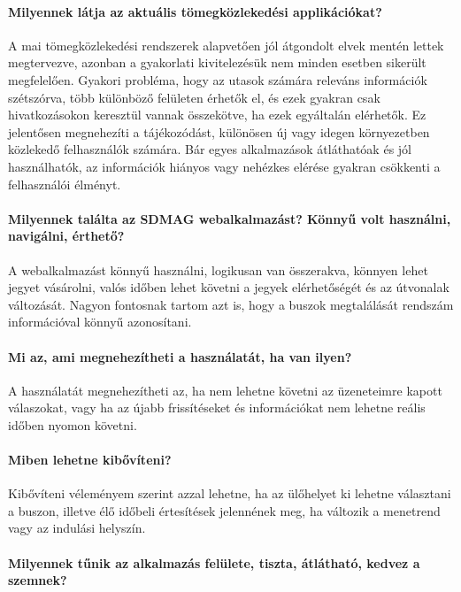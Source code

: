 \paragraph*{Milyennek látja az aktuális tömegközlekedési applikációkat?}

A mai tömegközlekedési rendszerek alapvetően jól átgondolt elvek mentén lettek megtervezve, azonban a gyakorlati kivitelezésük nem minden esetben sikerült megfelelően. Gyakori probléma, hogy az utasok számára releváns információk szétszórva, több különböző felületen érhetők el, és ezek gyakran csak hivatkozásokon keresztül vannak összekötve, ha ezek egyáltalán elérhetők. Ez jelentősen megnehezíti a tájékozódást, különösen új vagy idegen környezetben közlekedő felhasználók számára. Bár egyes alkalmazások átláthatóak és jól használhatók, az információk hiányos vagy nehézkes elérése gyakran csökkenti a felhasználói élményt.

\paragraph*{Milyennek találta az SDMAG webalkalmazást? Könnyű volt használni, navigálni, érthető?}

A webalkalmazást könnyű használni, logikusan van összerakva, könnyen lehet jegyet vásárolni, valós időben lehet követni a jegyek elérhetőségét és az útvonalak változását. Nagyon fontosnak tartom azt is, hogy a buszok megtalálását rendszám információval könnyű azonosítani.

\paragraph*{Mi az, ami megnehezítheti a használatát, ha van ilyen?}

A használatát megnehezítheti az, ha nem lehetne követni az üzeneteimre kapott válaszokat, vagy ha az újabb frissítéseket és információkat nem lehetne reális időben nyomon követni.

\paragraph*{Miben lehetne kibővíteni?}

Kibővíteni véleményem szerint azzal lehetne, ha az ülőhelyet ki lehetne választani a buszon, illetve élő időbeli értesítések jelennének meg, ha változik a menetrend vagy az indulási helyszín.

\paragraph*{Milyennek tűnik az alkalmazás felülete, tiszta, átlátható, kedvez a szemnek?}

